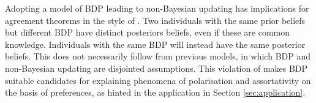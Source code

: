 Adopting a model of BDP leading to non-Bayesian updating has implications for agreement theorems in the style of \cite{aumannAgreeingDisagree1976}. Two individuals with the same prior beliefs but different BDP have distinct posteriors beliefs, even if these are common knowledge. Individuals with the same BDP will instead have the same posterior beliefs. This does not necessarily follow from previous models, in which BDP and non-Bayesian updating are disjointed assumptions. This violation of \citeauthor{aumannAgreeingDisagree1976} makes BDP suitable candidates for explaining phenomena of polarisation and assortativity on the basis of preferences, as hinted in the application in Section \ref{sec:application}.

